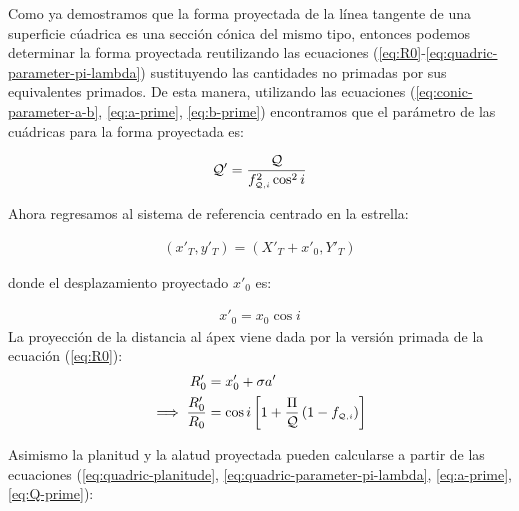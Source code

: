 Como ya demostramos que la forma proyectada de la línea tangente de una superficie cúadrica es una sección cónica del mismo tipo, entonces podemos determinar la forma proyectada reutilizando las ecuaciones (\ref{eq:R0}-\ref{eq:quadric-parameter-pi-lambda}) sustituyendo las cantidades no primadas por sus equivalentes primados. De esta manera, utilizando las ecuaciones (\ref{eq:conic-parameter-a-b}, \ref{eq:a-prime}, \ref{eq:b-prime}) encontramos que el parámetro de las cuádricas para la forma proyectada es:

\begin{align}
  \mathcal{Q}' = \frac{\mathcal{Q}}{f_{\scriptscriptstyle \mathcal{Q}, i}^2 \cos^2 i}\label{eq:Q-prime}
\end{align}

Ahora regresamos al sistema de referencia centrado en la estrella:

\begin{align}
  (x'_T, y'_T) = (X'_T + x'_0, Y'_T)
\end{align}

donde el desplazamiento proyectado $x'_0$ es:

\begin{align}
  x'_0 = x_0\cos i
\end{align}
La proyección de la distancia al ápex viene dada por la versión primada de la ecuación (\ref{eq:R0}):
\begin{align}
  R'_0 &=  x'_0 + \sigma a'\\
  \implies \frac{R'_0}{R_0} &= \cos i\left[1 + \frac{\Pi}{\mathcal{Q}}\left(1 - f_{\scriptscriptstyle \mathcal{Q}, i}\right)\right]
\end{align}

Asimismo la planitud y la alatud proyectada pueden calcularse a partir de las ecuaciones (\ref{eq:quadric-planitude}, \ref{eq:quadric-parameter-pi-lambda}, \ref{eq:a-prime}, \ref{eq:Q-prime}):

